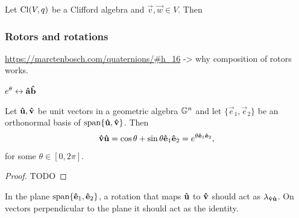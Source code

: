 \begin{proposition}
Let $\operatorname{Cl}(V,q)$ be a Clifford algebra and $\vec{v}, \vec{w}\in V$. Then
\end{proposition}



\subsubsection{Rotors and rotations}
\url{https://marctenbosch.com/quaternions/#h_16}
-> why composition of rotors works.

\begin{proposition}
$e^{\theta} \leftrightarrow \boldsymbol{\mathrm{\hat{a}}}\boldsymbol{\mathrm{\hat{b}}}$
\end{proposition}

\begin{lemma}
Let $\boldsymbol{\mathrm{\hat{u}}}, \boldsymbol{\mathrm{\hat{v}}}$ be unit vectors in a geometric algebra $\mathbb{G}^n$ and let $\{\vec{e}_1, \vec{e}_2\}$ be an orthonormal basis of $\operatorname{span}\{\boldsymbol{\mathrm{\hat{u}}},\boldsymbol{\mathrm{\hat{v}}}\}$. Then
\[ \boldsymbol{\mathrm{\hat{v}}}\boldsymbol{\mathrm{\hat{u}}} = \cos\theta + \sin\theta \boldsymbol{\mathrm{\hat{e}}}_1\boldsymbol{\mathrm{\hat{e}}}_2 = e^{\theta \boldsymbol{\mathrm{\hat{e}}}_1\boldsymbol{\mathrm{\hat{e}}}_2}, \]
for some $\theta \in [ 0,2\pi ]$.
\end{lemma}
\begin{proof}
TODO
\end{proof}


In the plane $\operatorname{span}\{\boldsymbol{\mathrm{\hat{e}}}_1,\boldsymbol{\mathrm{\hat{e}}}_2\}$, a rotation that maps $\boldsymbol{\mathrm{\hat{u}}}$ to $\boldsymbol{\mathrm{\hat{v}}}$ should act as $\lambda_{\boldsymbol{\mathrm{\hat{v}}}\boldsymbol{\mathrm{\hat{u}}}}$. On vectors perpendicular to the plane it should act as the identity.


